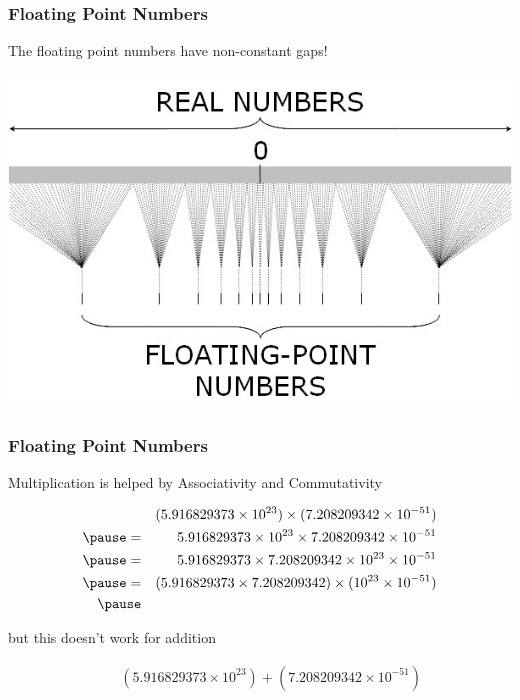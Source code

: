 \documentclass{beamer}
\begin{document}
\begin{frame}

\frametitle{Floating Point Numbers}

The floating point numbers have non-constant gaps!

\begin{center}
\includegraphics[scale=.6]{float-gaps.jpg}
\end{center}

\end{frame}

\begin{frame}
\frametitle{Floating Point Numbers}

Multiplication is helped by Associativity and Commutativity

\begin{eqnarray*}
     && (5.916829373 \times 10^{23}) \times (7.208209342 \times 10^{-51}) \\ \pause
  =  && 5.916829373 \times 10^{23} \times 7.208209342 \times 10^{-51} \\ \pause
  =  && 5.916829373 \times 7.208209342 \times 10^{23} \times 10^{-51} \\ \pause
  =  && (5.916829373 \times 7.208209342) \times (10^{23} \times 10^{-51}) \\ \pause
\end{eqnarray*}

but this doesn't work for addition \pause

\begin{eqnarray*}
      && (5.916829373 \times 10^{23}) + (7.208209342 \times 10^{-51}) \\
\end{eqnarray*}

\end{frame}
\end{document}
